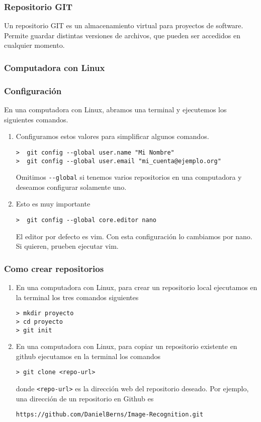 \documentclass{beamer}
\begin{document}
\begin{frame}
\frametitle{Repositorio GIT}

Un repositorio GIT es un almacenamiento virtual para proyectos de software. 
Permite guardar distintas versiones de archivos, que pueden ser accedidos en cualquier momento.

\end{frame}

\subsubsection{Computadora con Linux}

\begin{frame}[fragile]
\frametitle{Configuraci\'{o}n}

En una computadora con Linux, abramos una terminal y ejecutemos los siguientes comandos.

\begin{enumerate}
\item<1-> Configuramos estos valores para simplificar algunos comandos.
\begin{verbatim}
>  git config --global user.name "Mi Nombre"
>  git config --global user.email "mi_cuenta@ejemplo.org"
\end{verbatim}
Omitimos \verb+--global+ si tenemos varios repositorios en una computadora y deseamos configurar solamente uno.

\item<2->Esto es muy importante
\begin{verbatim}
>  git config --global core.editor nano
\end{verbatim}
El editor por defecto es vim. Con esta configuración lo cambiamos por nano.
Si quieren, prueben ejecutar vim. 
\end{enumerate}

\end{frame}

\begin{frame}[fragile]
\frametitle{Como crear repositorios}

\begin{enumerate}

\item<1-> En una computadora con Linux, para crear un repositorio local ejecutamos en la terminal los tres comandos siguientes
\begin{verbatim}
> mkdir proyecto
> cd proyecto
> git init
\end{verbatim}

\item<2-> En una computadora con Linux, para copiar un repositorio existente en github ejecutamos en la terminal los comandos
\begin{verbatim}
> git clone <repo-url>
\end{verbatim}
donde \verb|<repo-url>| es la direcci\'{o}n web del repositorio deseado.
Por ejemplo, una direcci\'{o}n de un repositorio en Github es
\begin{verbatim}
https://github.com/DanielBerns/Image-Recognition.git
\end{verbatim}
\end{enumerate}

\end{frame}
\end{document}
